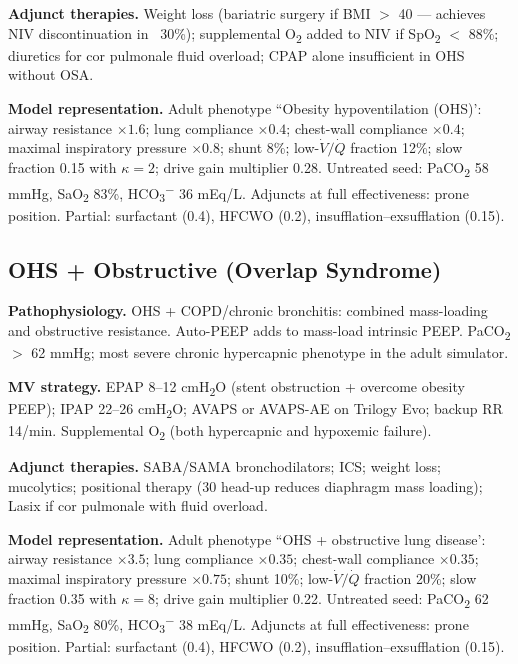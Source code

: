 \textbf{Adjunct therapies.} Weight loss (bariatric surgery if BMI $>$ 40 --- achieves NIV discontinuation in ~30\%); supplemental O\textsubscript{2} added to NIV if SpO\textsubscript{2} $<$ 88\%; diuretics for cor pulmonale fluid overload; CPAP alone insufficient in OHS without OSA.

\textbf{Model representation.} Adult phenotype ``Obesity hypoventilation (OHS)': airway resistance $\times1.6$; lung compliance $\times0.4$; chest-wall compliance $\times0.4$; maximal inspiratory pressure $\times0.8$; shunt 8\%; low-$\dot V/\dot Q$ fraction 12\%; slow fraction 0.15 with $\kappa=2$; drive gain multiplier 0.28. Untreated seed: PaCO\textsubscript{2} 58 mmHg, SaO\textsubscript{2} 83\%, HCO\textsubscript{3}\textsuperscript{$-$} 36 mEq/L. Adjuncts at full effectiveness: prone position. Partial: surfactant (0.4), HFCWO (0.2), insufflation--exsufflation (0.15).

\subsection{OHS + Obstructive (Overlap Syndrome)}
\textbf{Pathophysiology.} OHS + COPD/chronic bronchitis: combined mass-loading and obstructive resistance. Auto-PEEP adds to mass-load intrinsic PEEP. PaCO\textsubscript{2} $>$ 62 mmHg; most severe chronic hypercapnic phenotype in the adult simulator.

\textbf{MV strategy.} EPAP 8--12 cmH\textsubscript{2}O (stent obstruction + overcome obesity PEEP); IPAP 22--26 cmH\textsubscript{2}O; AVAPS or AVAPS-AE on Trilogy Evo; backup RR 14/min. Supplemental O\textsubscript{2} (both hypercapnic and hypoxemic failure).

\textbf{Adjunct therapies.} SABA/SAMA bronchodilators; ICS; weight loss; mucolytics; positional therapy (30\textdegree{} head-up reduces diaphragm mass loading); Lasix if cor pulmonale with fluid overload.

\textbf{Model representation.} Adult phenotype ``OHS + obstructive lung disease': airway resistance $\times3.5$; lung compliance $\times0.35$; chest-wall compliance $\times0.35$; maximal inspiratory pressure $\times0.75$; shunt 10\%; low-$\dot V/\dot Q$ fraction 20\%; slow fraction 0.35 with $\kappa=8$; drive gain multiplier 0.22. Untreated seed: PaCO\textsubscript{2} 62 mmHg, SaO\textsubscript{2} 80\%, HCO\textsubscript{3}\textsuperscript{$-$} 38 mEq/L. Adjuncts at full effectiveness: prone position. Partial: surfactant (0.4), HFCWO (0.2), insufflation--exsufflation (0.15).

